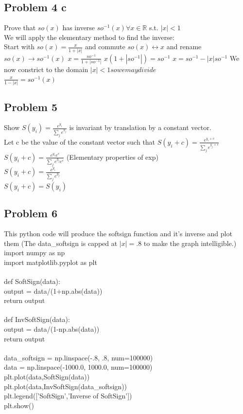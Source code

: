 \documentclass[a4paper,12pt]{article}
\begin{document}
\subsection{Problem 4 c}
Prove that $so(x)$ has inverse $so^{-1}(x) \forall x \in \mathbb{R}$ s.t. $|x| <1$\\
We will apply the elementary method to find the inverse:\\
Start with $so(x) =\frac{x}{1+|x|}$ and commute $so(x)\leftrightarrow x$ and rename $so(x)\rightarrow so^{-1}(x)$
$x =\frac{so^{-1}}{1+|so^{-1}|}$
$x(1+|so^{-1}|) = so^{-1}$
$x = so^{-1} - |x|so^{-1}$
We now constrict to the domain  $|x| <1 so we may divide$\\
$\frac{x}{1-|x|} =so^{-1}(x)$

\subsection{Problem 5}
Show $S(y_i) = \frac{e^{y_i}}{\sum_{j}e^{y_j}}$ is invariant by translation by a constant vector.\\
Let c be the value of the constant vector such that $S(y_i + c) = \frac{e^{y_i + c}}{\sum_{j}e^{y_j + c}}$\\
$S(y_i + c) = \frac{e^{y_i }e^c}{\sum_{j}e^{y_j}e^c}$ (Elementary properties of exp)\\
$S(y_i + c) = \frac{e^{y_i }}{\sum_{j}e^{y_j}}$\\
$S(y_i + c) = S(y_i)$\\

\subsection{Problem 6}
This python code will produce the softsign function and it's inverse and plot them (The data\_softsign is capped at $|x|=.8$ to make the graph intelligible.)\\
import numpy as np\\
import matplotlib.pyplot as plt\\
\\
def SoftSign(data):\\
    output = data/(1+np.abs(data))\\
    return output\\
\\
def InvSoftSign(data):\\
    output = data/(1-np.abs(data))\\
    return output\\
\\
data\_softsign = np.linspace(-.8, .8, num=100000)\\
data = np.linspace(-1000.0, 1000.0, num=100000)\\
plt.plot(data,SoftSign(data))\\
plt.plot(data,InvSoftSign(data\_softsign))\\
plt.legend(['SoftSign','Inverse of SoftSign'])\\
plt.show()\\
\end{document}

